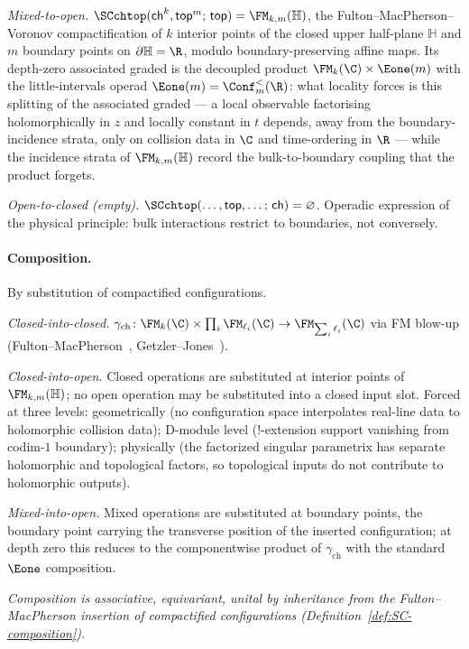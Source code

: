 \emph{Mixed-to-open.}
$\SCchtop(\mathsf{ch}^k, \mathsf{top}^m;\,\mathsf{top}) =
\FM_{k,m}(\mathbb H)$, the Fulton--MacPherson--Voronov
compactification of $k$ interior points of the closed upper
half-plane $\mathbb H$ and $m$ boundary points on
$\partial\mathbb H = \R$, modulo boundary-preserving affine maps.
Its depth-zero associated graded is the decoupled product
$\FM_k(\C) \times \Eone(m)$ with the little-intervals operad
$\Eone(m) = \Conf_m^{<}(\R)$: what locality forces is this
splitting of the associated graded --- a local observable
factorising holomorphically in $z$ and locally constant in $t$
depends, away from the boundary-incidence strata, only on
collision data in $\C$ and time-ordering in $\R$ --- while the
incidence strata of $\FM_{k,m}(\mathbb H)$ record the
bulk-to-boundary coupling that the product forgets.

\emph{Open-to-closed (empty).}
$\SCchtop(\ldots, \mathsf{top}, \ldots;\,\mathsf{ch}) = \varnothing$.
Operadic expression of the physical principle: bulk
interactions restrict to boundaries, not conversely.

\paragraph{Composition.}
By substitution of compactified configurations.

\emph{Closed-into-closed.}
$\gamma_{\mathrm{ch}}\colon \FM_k(\C) \times \prod_i
\FM_{\ell_i}(\C) \to \FM_{\sum_i \ell_i}(\C)$ via FM blow-up
(Fulton--MacPherson~\cite{FM94}, Getzler--Jones~\cite{GJ94}).

\emph{Closed-into-open.}
Closed operations are substituted at interior points of
$\FM_{k,m}(\mathbb H)$; no open operation may be substituted into a
closed input slot. Forced at three levels: geometrically (no
configuration space interpolates real-line data to holomorphic
collision data); D-module level (!-extension support vanishing
from codim-$1$ boundary); physically (the factorized singular
parametrix has separate holomorphic and topological factors, so
topological inputs do not contribute to holomorphic outputs).

\emph{Mixed-into-open.}
Mixed operations are substituted at boundary points, the boundary
point carrying the transverse position of the inserted
configuration; at depth zero this reduces to the componentwise
product of $\gamma_{\mathrm{ch}}$ with the standard $\Eone$
composition.

\begin{center}
\emph{Composition is associative, equivariant, unital by
inheritance from the Fulton--MacPherson insertion of compactified
configurations
(Definition~\textup{\ref{def:SC-composition}}).}
\end{center}

